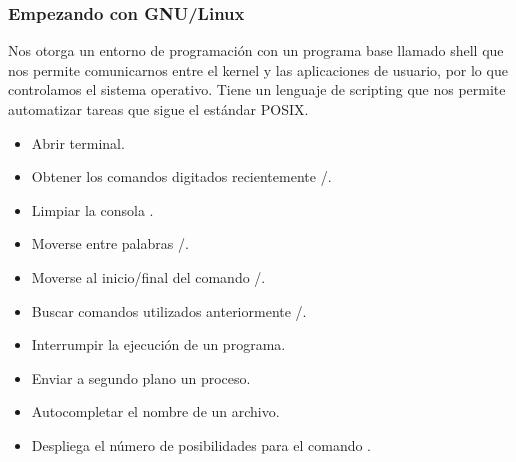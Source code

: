\begin{frame}
	\frametitle{Empezando con GNU/Linux}

	Nos otorga un entorno de programación con un programa base
	llamado shell que nos permite comunicarnos entre el kernel y las
	aplicaciones de usuario, por lo que controlamos el sistema
	operativo.
	Tiene un lenguaje de scripting que nos permite automatizar tareas
	que sigue el estándar POSIX.

	\begin{itemize}
		\item
		
		Abrir terminal\quad{}.
		
		\item
		
		Obtener los comandos digitados recientemente
		\quad\keys{\arrowkeyup}/\keys{\arrowkeydown}.
		
		\item
		
		Limpiar la consola \quad{}.
		
		\item
		
		Moverse entre palabras \quad{}/.
		
		\item
		
		Moverse al inicio/final del comando
		\quad{}/.
		
		\item
		
		Buscar comandos utilizados anteriormente
		\quad{}/.
		
		\item
		
		Interrumpir la ejecución de un programa\quad{}.
		
		\item
		
		Enviar a segundo plano un proceso\quad{}.
		
		\item
		
		Autocompletar el nombre de un archivo\quad\keys{\tab}.
		
		\item
		
		Despliega el número de posibilidades para el comando
		\quad\keys{\tab+\tab}.
	\end{itemize}
\end{frame}

